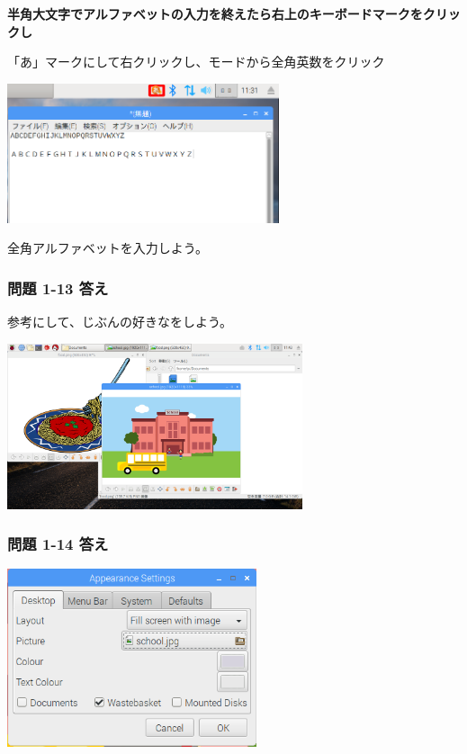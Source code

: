 \bigskip

{\bfseries
  半角大文字でアルファベットの入力を終えたら右上のキーボードマークをクリックし

  「あ」マークにして右クリックし、モードから全角英数をクリック}



\bigskip

\bigskip


\centering
\includegraphics[width=0.6\textwidth]{text01-img/textbook-img220.png}
\flushleft

\bigskip

全角アルファベットを入力しよう。
\clearpage

\subsubsection{\bfseries 問題 1-13 答え}

参考にして、じぶんの好きなをしよう。

\centering
\includegraphics[width=0.65\textwidth]{text01-img/textbook-img221.png}
\flushleft

\bigskip


\subsubsection{\bfseries 問題 1-14 答え}



\centering
\includegraphics[width=0.55\textwidth]{text01-img/textbook-img222.png}


